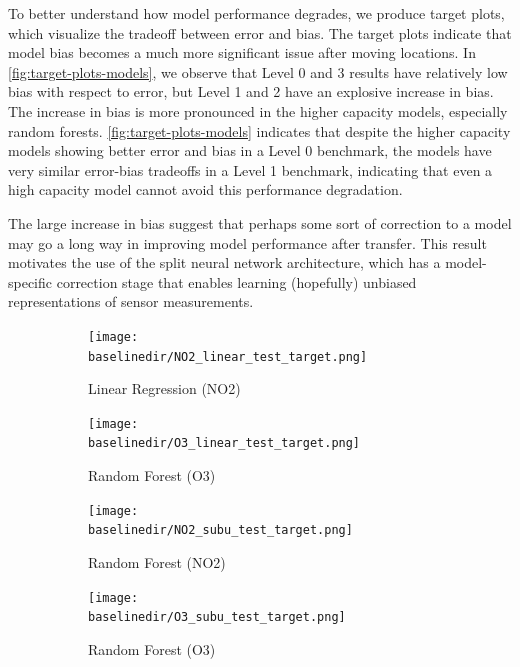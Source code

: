 \documentclass[journal abbreviation, manuscript]{copernicus}
\begin{document}
To better understand how model performance degrades, we produce
target plots, which visualize the tradeoff between error and bias.
The target plots indicate that model bias becomes a much more significant issue
after moving locations. In \autoref{fig:target-plots-models}, we observe
that Level 0 and 3 results have relatively low bias with respect
to error, but Level 1 and 2 have an explosive increase
in bias. The increase in bias is more pronounced in the higher capacity models, especially random forests. \autoref{fig:target-plots-models} indicates that despite the higher capacity models showing better error and bias in a Level 0 benchmark, the models have very similar error-bias tradeoffs in a Level 1 benchmark, indicating that even a high capacity model cannot avoid this performance degradation.

The large increase in bias suggest that perhaps some sort of correction to a model may go a long way in improving model performance after transfer. This result motivates the use of the split neural network architecture, which has a model-specific correction stage that enables learning (hopefully) unbiased representations of sensor measurements.

\begin{figure}[H]
\centering
\begin{subfigure}{0.45\textwidth}
\texttt{[image: \\baselinedir/NO2\_linear\_test\_target.png]}
\caption{Linear Regression (NO2)}
\end{subfigure}
\begin{subfigure}{0.45\textwidth}
\texttt{[image: \\baselinedir/O3\_linear\_test\_target.png]}
\caption{Random Forest (O3)}
\end{subfigure}
\begin{subfigure}{0.45\textwidth}
\texttt{[image: \\baselinedir/NO2\_subu\_test\_target.png]}
\caption{Random Forest (NO2)}
\end{subfigure}
\begin{subfigure}{0.45\textwidth}
\texttt{[image: \\baselinedir/O3\_subu\_test\_target.png]}
\caption{Random Forest (O3)}
\end{subfigure}
\caption{}
\label{fig:target-plots-models}
\end{figure}
\end{document}

